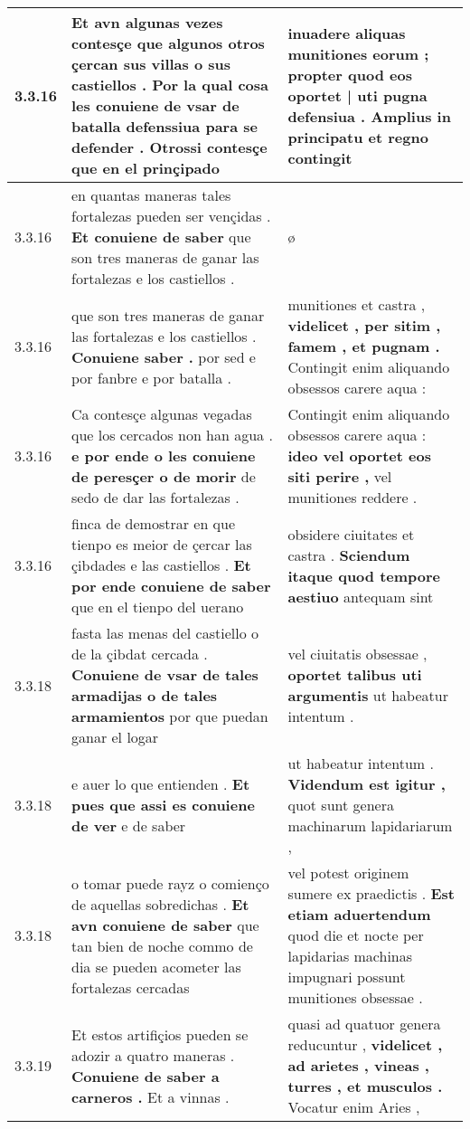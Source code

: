 \begin{tabular}{|p{1cm}|p{6.5cm}|p{6.5cm}|}
3.3.16 & Et avn algunas vezes contesçe que algunos otros çercan sus villas o sus castiellos . \textbf{ Por la qual cosa les conuiene de vsar de batalla defenssiua para se defender . } Otrossi contesçe que en el prinçipado & inuadere aliquas munitiones eorum ; \textbf{ propter quod eos oportet | uti pugna defensiua . } Amplius in principatu et regno contingit \\\hline
3.3.16 & en quantas maneras tales fortalezas pueden ser vençidas . \textbf{ Et conuiene de saber } que son tres maneras de ganar las fortalezas e los castiellos . & ø \\\hline
3.3.16 & que son tres maneras de ganar las fortalezas e los castiellos . \textbf{ Conuiene saber . } por sed e por fanbre e por batalla . & munitiones et castra , \textbf{ videlicet , per sitim , famem , et pugnam . } Contingit enim aliquando obsessos carere aqua : \\\hline
3.3.16 & Ca contesçe algunas vegadas que los cercados non han agua . \textbf{ e por ende o les conuiene de peresçer o de morir } de sedo de dar las fortalezas . & Contingit enim aliquando obsessos carere aqua : \textbf{ ideo vel oportet eos siti perire , } vel munitiones reddere . \\\hline
3.3.16 & finca de demostrar en que tienpo es meior de çercar las çibdades e las castiellos . \textbf{ Et por ende conuiene de saber } que en el tienpo del uerano & obsidere ciuitates et castra . \textbf{ Sciendum itaque quod tempore aestiuo } antequam sint \\\hline
3.3.18 & fasta las menas del castiello o de la çibdat cercada . \textbf{ Conuiene de vsar de tales armadijas o de tales armamientos } por que puedan ganar el logar & vel ciuitatis obsessae , \textbf{ oportet talibus uti argumentis } ut habeatur intentum . \\\hline
3.3.18 & e auer lo que entienden . \textbf{ Et pues que assi es conuiene de ver } e de saber & ut habeatur intentum . \textbf{ Videndum est igitur , } quot sunt genera machinarum lapidariarum , \\\hline
3.3.18 & o tomar puede rayz o comienço de aquellas sobredichas . \textbf{ Et avn conuiene de saber } que tan bien de noche commo de dia se pueden acometer las fortalezas cercadas & vel potest originem sumere ex praedictis . \textbf{ Est etiam aduertendum } quod die et nocte per lapidarias machinas impugnari possunt munitiones obsessae . \\\hline
3.3.19 & Et estos artifiçios pueden se adozir a quatro maneras . \textbf{ Conuiene de saber a carneros . } Et a vinnas . & quasi ad quatuor genera reducuntur , \textbf{ videlicet , ad arietes , vineas , turres , et musculos . } Vocatur enim Aries , \\\hline

\end{tabular}
